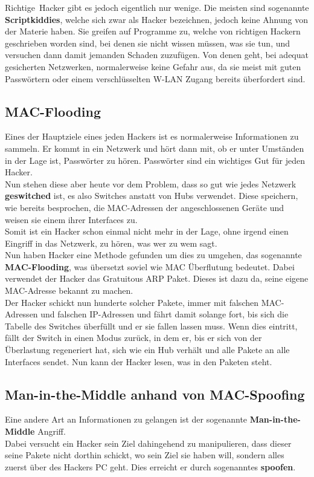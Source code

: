 \documentclass[12pt,a4paper]{report}
\begin{document}
\glqq Richtige\grqq \ Hacker gibt es jedoch eigentlich nur wenige. Die meisten sind sogenannte \textbf{Scriptkiddies}, welche sich zwar als Hacker bezeichnen, jedoch keine Ahnung von der Materie haben. Sie greifen auf Programme zu, welche von richtigen Hackern geschrieben worden sind, bei denen sie nicht wissen müssen, was sie tun, und versuchen dann damit jemanden Schaden zuzufügen. Von denen geht, bei adequat gesicherten Netzwerken, normalerweise keine Gefahr aus, da sie meist mit guten Passwörtern oder einem verschlüsselten W-LAN Zugang bereits überfordert sind.

\subsection{MAC-Flooding}\label{ssec:mflood}
Eines der Hauptziele eines jeden Hackers ist es normalerweise Informationen zu sammeln. Er kommt in ein Netzwerk und hört dann mit, ob er unter Umständen in der Lage ist, Passwörter zu hören. Passwörter sind ein wichtiges Gut für jeden Hacker.\\
Nun stehen diese aber heute vor dem Problem, dass so gut wie jedes Netzwerk \textbf{geswitched} ist, es also Switches anstatt von Hubs verwendet. Diese speichern, wie bereits besprochen, die MAC-Adressen der angeschlossenen Geräte und weisen sie einem ihrer Interfaces zu.\\
Somit ist ein Hacker schon einmal nicht mehr in der Lage, ohne irgend einen Eingriff in das Netzwerk, zu hören, was wer zu wem sagt.\\

Nun haben Hacker eine Methode gefunden um dies zu umgehen, das sogenannte \textbf{MAC-Flooding}, was übersetzt soviel wie MAC Überflutung bedeutet. Dabei verwendet der Hacker das Gratuitous ARP Paket. Dieses ist dazu da, seine eigene MAC-Adresse bekannt zu machen.\\
Der Hacker schickt nun hunderte solcher Pakete, immer mit falschen MAC-Adressen und falschen IP-Adressen und fährt damit solange fort, bis sich die Tabelle des Switches überfüllt und er sie fallen lassen muss. Wenn dies eintritt, fällt der Switch in einen Modus zurück, in dem er, bis er sich von der Überlastung regeneriert hat, sich wie ein Hub verhält und alle Pakete an alle Interfaces sendet. Nun kann der Hacker lesen, was in den Paketen steht.\\

\subsection{Man-in-the-Middle anhand von MAC-Spoofing}\label{ssec:mspoof}
Eine andere Art an Informationen zu gelangen ist der sogenannte \textbf{Man-in-the-Middle} Angriff.\\
Dabei versucht ein Hacker sein Ziel dahingehend zu manipulieren, dass dieser seine Pakete nicht dorthin schickt, wo sein Ziel sie haben will, sondern alles zuerst über des Hackers PC geht. Dies erreicht er durch sogenanntes \textbf{spoofen}.\\
\end{document}
